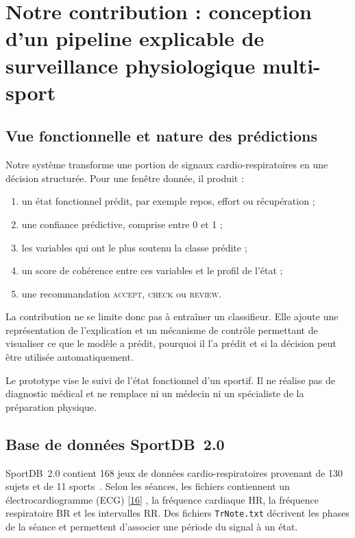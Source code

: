 \documentclass[12pt,a4paper]{article}
\newcommand{\openaccessref}[2]{%
  \nobreak\hspace{0.08em}%
  \href{#2}{\textcolor{green!35!black}{[#1]}}%
}
\begin{document}
\section{Notre contribution : conception d'un pipeline explicable de surveillance physiologique multi-sport}
\label{sec:sujet}

\subsection{Vue fonctionnelle et nature des prédictions}

Notre système transforme une portion de signaux cardio-respiratoires en une
décision structurée. Pour une fenêtre donnée, il produit :

\begin{enumerate}[leftmargin=1.8em]
  \item un état fonctionnel prédit, par exemple repos, effort ou récupération ;
  \item une confiance prédictive, comprise entre 0 et 1 ;
  \item les variables qui ont le plus soutenu la classe prédite ;
  \item un score de cohérence entre ces variables et le profil de l'état ;
  \item une recommandation \textsc{accept}, \textsc{check} ou
  \textsc{review}.
\end{enumerate}

La contribution ne se limite donc pas à entraîner un classifieur. Elle ajoute
une représentation de l'explication et un mécanisme de contrôle permettant de
visualiser ce que le modèle a prédit, pourquoi il l'a prédit et si la décision
peut être utilisée automatiquement.

Le prototype vise le suivi de l'état fonctionnel d'un sportif. Il ne réalise
pas de diagnostic médical et ne remplace ni un médecin ni un spécialiste de
la préparation physique.

\subsection{Base de données SportDB~2.0}

SportDB~2.0\cite{sportdb2data} contient 168 jeux de données cardio-respiratoires provenant de
130 sujets et de 11 sports~\cite{sportdb2paper}. Selon les séances, les
fichiers contiennent un électrocardiogramme (ECG)\openaccessref{16}{https://journals.plos.org/plosone/article?id=10.1371/journal.pone.0084018}, la fréquence cardiaque HR,
la fréquence respiratoire BR et les intervalles RR. Des fichiers
\texttt{TrNote.txt} décrivent les phases de la séance et permettent
d'associer une période du signal à un état.
\end{document}
